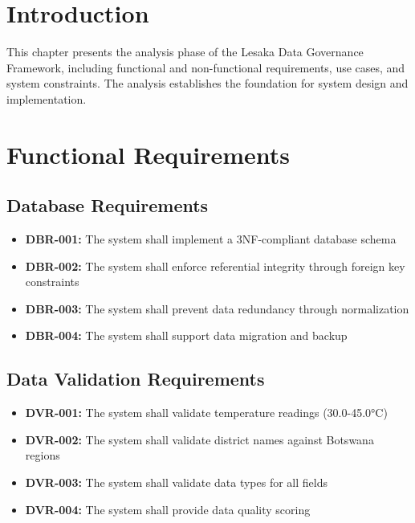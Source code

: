 
\section{Introduction}

This chapter presents the analysis phase of the Lesaka Data Governance Framework, including functional and non-functional requirements, use cases, and system constraints. The analysis establishes the foundation for system design and implementation.

\section{Functional Requirements}

\subsection{Database Requirements}

\begin{itemize}
    \item \textbf{DBR-001:} The system shall implement a 3NF-compliant database schema
    \item \textbf{DBR-002:} The system shall enforce referential integrity through foreign key constraints
    \item \textbf{DBR-003:} The system shall prevent data redundancy through normalization
    \item \textbf{DBR-004:} The system shall support data migration and backup
\end{itemize}

\subsection{Data Validation Requirements}

\begin{itemize}
    \item \textbf{DVR-001:} The system shall validate temperature readings (30.0-45.0°C)
    \item \textbf{DVR-002:} The system shall validate district names against Botswana regions
    \item \textbf{DVR-003:} The system shall validate data types for all fields
    \item \textbf{DVR-004:} The system shall provide data quality scoring
\end{itemize}

